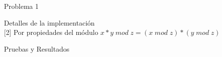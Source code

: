 \begin{section}{Problema 1}
\begin{subsection}{Detalles de la implementación}
\vspace{0.5cm}
 \\
{\footnotesize [2] Por propiedades del módulo $x*y\; mod \; z = (x\; mod\; z)*(y\; mod\; z)$ } \\


	\end{subsection}

	\begin{subsection}{Pruebas y Resultados}

	\end{subsection}

\end{section}


